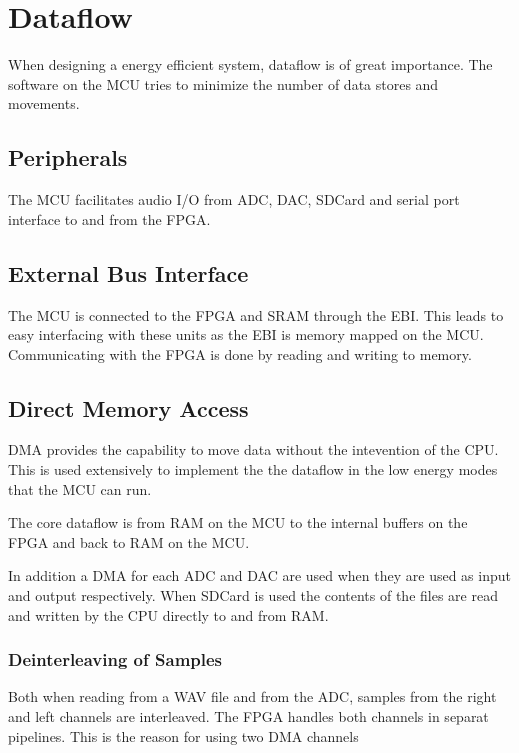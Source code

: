 \section{Dataflow}

When designing a energy efficient system, dataflow is of great importance. The software on the MCU tries to minimize the number of data stores and movements. 

\subsection{Peripherals}
The MCU facilitates audio I/O from ADC, DAC, SDCard and serial port interface to and from the FPGA. 


\subsection{External Bus Interface}
The MCU is connected to the FPGA and SRAM through the EBI. This leads to easy interfacing with these units as the EBI is memory mapped on the MCU. Communicating with the FPGA is done by reading and writing to memory. 


\subsection{Direct Memory Access}
DMA provides the capability to move data without the intevention of the CPU. 
This is used extensively to implement the the dataflow in the low energy modes
that the MCU can run.

The core dataflow is from RAM on the MCU to the internal buffers on the FPGA 
and back to RAM on the MCU. 

In addition a DMA for each ADC and DAC are used when they are used as input and 
output respectively. When SDCard is used the contents of the files are read and
written by the CPU directly to and from RAM. 

\subsubsection{Deinterleaving of Samples}

Both when reading from a WAV file and from the ADC, samples from the
right and left channels are interleaved. The FPGA handles both channels in separat
pipelines. This is the reason for using two DMA channels

